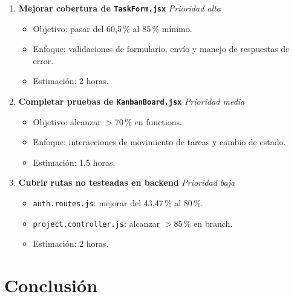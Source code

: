 \documentclass[12pt, a4paper]{article}
\begin{document}
\begin{enumerate}[leftmargin=1.5em, itemsep=8pt]

  \item \textbf{Mejorar cobertura de \texttt{TaskForm.jsx}} \hfill\textit{Prioridad alta}
  \begin{itemize}[leftmargin=1.2em, topsep=2pt]
    \item Objetivo: pasar del 60,5\,\% al 85\,\% mínimo.
    \item Enfoque: validaciones de formulario, envío y manejo de respuestas de error.
    \item Estimación: 2 horas.
  \end{itemize}

  \item \textbf{Completar pruebas de \texttt{KanbanBoard.jsx}} \hfill\textit{Prioridad media}
  \begin{itemize}[leftmargin=1.2em, topsep=2pt]
    \item Objetivo: alcanzar $>$70\,\% en functions.
    \item Enfoque: interacciones de movimiento de tareas y cambio de estado.
    \item Estimación: 1,5 horas.
  \end{itemize}

  \item \textbf{Cubrir rutas no testeadas en backend} \hfill\textit{Prioridad baja}
  \begin{itemize}[leftmargin=1.2em, topsep=2pt]
    \item \texttt{auth.routes.js}: mejorar del 43,47\,\% al 80\,\%.
    \item \texttt{project.controller.js}: alcanzar $>$85\,\% en branch.
    \item Estimación: 2 horas.
  \end{itemize}

\end{enumerate}

\section{Conclusión}
\end{document}
